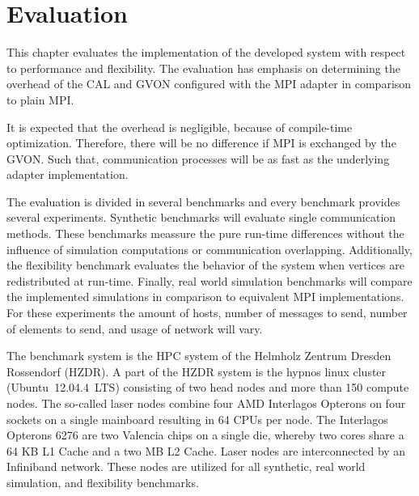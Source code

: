 \chapter{Evaluation}
\label{sec:evaluation}


This chapter evaluates the implementation of the developed
system with respect to performance and flexibility.  The
evaluation has emphasis on determining the overhead of the CAL and GVON
configured with the MPI adapter in comparison to plain MPI.

It is expected that the overhead is negligible, because of
compile-time optimization. Therefore, there will be no difference if
MPI is exchanged by the GVON. Such that, communication processes will
be as fast as the underlying adapter implementation.

The evaluation is divided in several benchmarks and every benchmark
provides several experiments. Synthetic benchmarks will evaluate
single communication methods. These benchmarks meassure the pure
run-time differences without the influence of simulation computations
or communication overlapping.  Additionally, the flexibility benchmark
evaluates the behavior of the system when vertices are redistributed
at run-time. Finally, real world simulation benchmarks will compare
the implemented simulations in comparison to equivalent MPI
implementations. For these experiments the amount of hosts, number of
messages to send, number of elements to send, and usage of network
will vary.

The benchmark system is the HPC system of the Helmholz Zentrum Dresden
Rossendorf (HZDR)\cite{ref:hzdr_cluster}.  A part of the HZDR system
is the hypnos linux cluster (Ubuntu~12.04.4~LTS) consisting of two
head nodes and more than 150 compute nodes.  The so-called laser nodes
combine four AMD Interlagos Opterons on four sockets on a single
mainboard resulting in 64 CPUs per node.  The Interlagos Opterons 6276
are two Valencia chips on a single die, whereby two cores share a 64 KB
L1 Cache and a two MB L2 Cache. Laser nodes are interconnected by an
Infiniband network. These nodes are utilized for all synthetic, real
world simulation, and flexibility benchmarks.

